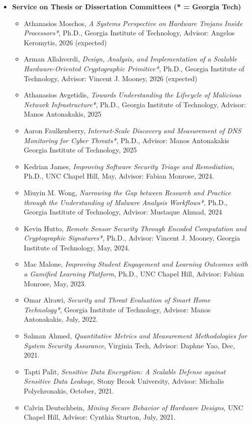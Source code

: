 \documentclass[11pt]{article}
\newcommand{\bibgap}{\vspace{0.3\baselineskip}}
\begin{document}
\begin{itemize}
\begin{itemize}
\bibgap
\item {\bf Service on Thesis or Dissertation Committees (* = Georgia Tech)}
\begin{itemize}
	\item Athanasios Moschos, {\it A Systems Perspective on Hardware Trojans Inside Processors*}, Ph.D.,  Georgia Institute of Technology, Advisor: Angelos Keromytis, 2026 (expected)
	\item Arman Allahverdi, {\it Design, Analysis, and Implementation of a Scalable Hardware-Oriented Cryptographic Primitive*}, Ph.D.,  Georgia Institute of Technology, Advisor: Vincent J. Mooney,  2026 (expected)
	\item Athanasios Avgetidis, {\it Towards Understanding the Lifecycle of Malicious Network Infrastructure*}, Ph.D., Georgia Institute of Technology, Advisor: Manos Antonakakis, 2025
	\item Aaron Faulkenberry, {\it Internet-Scale Discovery and Measurement of DNS Monitoring for Cyber Threats*}, Ph.D.,  Advisor: Manos Antonakakis Georgia Institute of Technology, 2025
	\item Kedrian James, {\it Improving Software Security Triage and Remediation}, Ph.D., UNC Chapel Hill, May, Advisor: Fabian Monrose, 2024.
	\item Miuyin M. Wong, {\it Narrowing the Gap between Research and Practice through the Understanding of Malware Analysis Workflows*}, Ph.D., Georgia Institute of Technology, Advisor: Mustaque Ahmad, 2024
	\item Kevin Hutto, {\it Remote Sensor Security Through Encoded Computation and Cryptographic Signatures*}, Ph.D., Advisor: Vincent J. Mooney, Georgia Institute of Technology, May, 2024.
	\item Mac Malone, {\it Improving Student Engagement and Learning Outcomes with a Gamified Learning Platform}, Ph.D., UNC  Chapel Hill, Advisor: Fabian Monrose, May, 2023.
	\item Omar Alrawi, {\it Security and Threat Evaluation of Smart Home Technology*}, Georgia Institute of Technology, Advisor: Manos Antonakakis, July, 2022.
	\item Salman Ahmed, {\it Quantitative Metrics and Measurement Methodologies for System Security Assurance}, Virginia Tech, Advisor: Daphne Yao,  Dec, 2021.
	\item Tapti Palit, {\it Sensitive Data Encryption: A Scalable Defense against Sensitive Data Leakage}, Stony Brook University, Advisor: Michalis Polychronakis, October, 2021.
	\item Calvin Deutschbein, {\it Mining Secure Behavior of Hardware Designs}, UNC Chapel Hill, Advisor: Cynthia Sturton, July, 2021.
	

\end{itemize}
\end{itemize}
\end{itemize}
\end{document}
